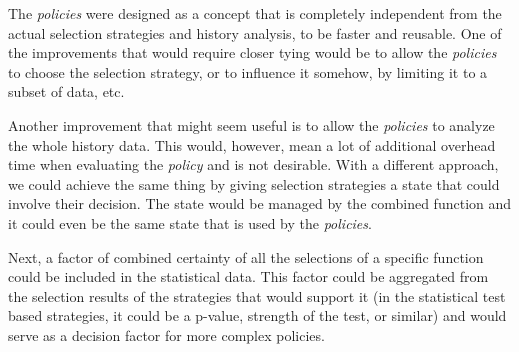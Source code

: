 The \textit{policies} were designed as a concept that is completely independent from the actual selection strategies and history analysis, to be faster and reusable. One of the improvements that would require closer tying would be to allow the \textit{policies} to choose the selection strategy, or to influence it somehow, by limiting it to a subset of data, etc. 

Another improvement that might seem useful is to allow the \textit{policies} to analyze the whole history data. This would, however, mean a lot of additional overhead time when evaluating the \textit{policy} and is not desirable.
With a different approach, we could achieve the same thing by giving selection strategies a state that could involve their decision. The state would be managed by the combined function and it could even be the same state that is used by the \textit{policies}. 

Next, a factor of combined certainty of all the selections of a specific function could be included in the statistical data. This factor could be aggregated from the selection results of the strategies that would support it (in the statistical test based strategies, it could be a p-value, strength of the test, or similar) and would serve as a decision factor for more complex policies.

